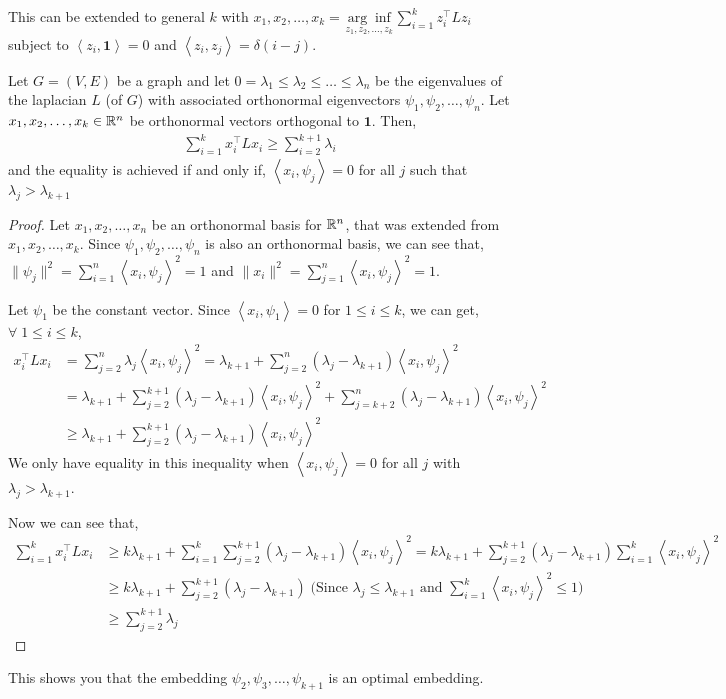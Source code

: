 \documentclass[11pt,letterpaper]{article}
\newcommand{\vOne}{\mathbf{1}}
\newcommand{\dpro}[1]{\left \langle #1 \right \rangle}
\begin{document}
This can be extended to general $k$ with $x_1,x_2,\dots,x_k = \underset{z_1,z_2,\dots,z_k}{\arg \inf} \sum_{i=1}^k z_i^\top L z_i$ subject to $\dpro{z_i,\vOne} = 0$ and $\dpro{z_i,z_j} = \delta(i-j)$.

\begin{theorem}
Let $G = (V,E)$ be a graph and let $0=\lambda_1 \le \lambda_2 \le \dots \le \lambda_n$ be the eigenvalues of the laplacian $L$ (of $G$) with associated orthonormal eigenvectors $\psi_1,\psi_2,\dots,\psi_n$. Let $x_1,x_2,\dots,x_k \in \mathbb{R}^n$ be orthonormal vectors orthogonal to $\vOne$. Then,
\begin{align*}
\sum_{i=1}^k x_i^\top L x_i \ge \sum_{i=2}^{k+1} \lambda_i
\end{align*}
and the equality is achieved if and only if, $\dpro{x_i,\psi_j} = 0$ for all $j$ such that $\lambda_j > \lambda_{k+1}$ 
\end{theorem}

\begin{proof}
Let $x_1,x_2,\dots,x_n$ be an orthonormal basis for $\mathbb{R}^n$, that was extended from $x_1,x_2,\dots,x_k$. Since $\psi_1,\psi_2,\dots,\psi_n$ is also an orthonormal basis, we can see that, $\|\psi_j\|^2 = \sum_{i=1}^n \dpro{x_i,\psi_j}^2 = 1$ and $\|x_i\|^2 = \sum_{j=1}^n \dpro{x_i,\psi_j}^2=1$. 

Let $\psi_1$ be the constant vector. Since $\dpro{x_i,\psi_1} = 0$ for $1 \le i \le k$, we can get, $\forall \; 1 \le i \le k$,
\begin{align*}
x_i^\top L x_i &= \sum_{j=2}^n \lambda_j \dpro{x_i,\psi_j}^2 = \lambda_{k+1} + \sum_{j=2}^n \left(\lambda_j-\lambda_{k+1}\right) \dpro{x_i,\psi_j}^2 \\
&= \lambda_{k+1} + \sum_{j=2}^{k+1} \left(\lambda_j-\lambda_{k+1}\right) \dpro{x_i,\psi_j}^2 + \sum_{j=k+2}^n \left(\lambda_j-\lambda_{k+1}\right) \dpro{x_i,\psi_j}^2 \\
& \ge \lambda_{k+1} + \sum_{j=2}^{k+1} \left(\lambda_j-\lambda_{k+1}\right) \dpro{x_i,\psi_j}^2
\end{align*}
We only have equality in this inequality when $\dpro{x_i,\psi_j} = 0$ for all $j$ with $\lambda_j > \lambda_{k+1}$.

Now we can see that,
\begin{align*}
\sum_{i=1}^k x_i^\top L x_i &\ge k \lambda_{k+1} + \sum_{i=1}^k \sum_{j=2}^{k+1} \left(\lambda_j-\lambda_{k+1}\right) \dpro{x_i,\psi_j}^2 = k \lambda_{k+1} +  \sum_{j=2}^{k+1} \left(\lambda_j-\lambda_{k+1}\right) \sum_{i=1}^k \dpro{x_i,\psi_j}^2 \\
& \ge k\lambda_{k+1} + \sum_{j=2}^{k+1} \left(\lambda_j-\lambda_{k+1}\right) \; \text{(Since $\lambda_j \le \lambda_{k+1}$ and $\sum_{i=1}^k \dpro{x_i,\psi_j}^2 \le 1$)}\\
& \ge \sum_{j=2}^{k+1} \lambda_j
\end{align*}
\end{proof}

This shows you that the embedding $\psi_2,\psi_3,\dots,\psi_{k+1}$ is an optimal embedding.
\end{document}
